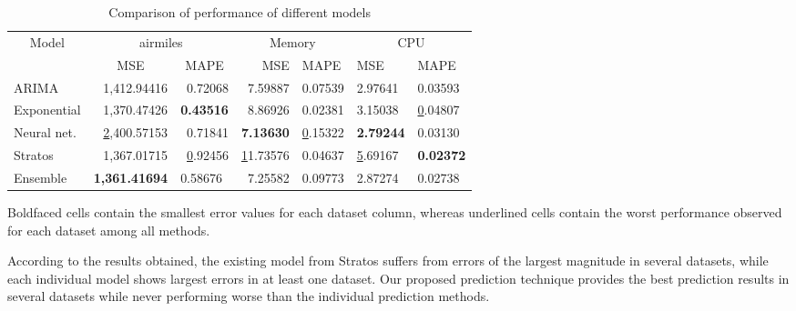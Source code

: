 \begin{table}[]
\centering
\caption{Comparison of performance of different models}
\label{my-label}
\begin{tabular}{|l|r|r|r|l|l|l|}
\hline
\multicolumn{1}{|c|}{\multirow{2}{*}{Model}} & \multicolumn{2}{c|}{airmiles}                                            & \multicolumn{2}{c|}{Memory}      & \multicolumn{2}{c|}{CPU}            \\ \cline{2-7} 
\multicolumn{1}{|c|}{}                       & \multicolumn{1}{c|}{MSE}                  & \multicolumn{1}{c|}{MAPE}    & MSE              & MAPE          & MSE              & MAPE             \\ \hline
ARIMA                                        & 1,412.94416                               & 0.72068                      & 7.59887          & 0.07539       & 2.97641          & 0.03593          \\ \hline
Exponential                                  & 1,370.47426                               & \textbf{0.43516}             & 8.86926          & 0.02381       & 3.15038          & {\ul 0.04807}    \\ \hline
Neural net.                                  & {\ul 2,400.57153}                         & 0.71841                      & \textbf{7.13630} & {\ul 0.15322} & \textbf{2.79244} & 0.03130          \\ \hline
Stratos                                      & 1,367.01715                               & {\ul 0.92456}                & {\ul 11.73576}   & 0.04637       & {\ul 5.69167}    & \textbf{0.02372} \\ \hline
Ensemble                                     & \multicolumn{1}{l|}{\textbf{1,361.41694}} & \multicolumn{1}{l|}{0.58676} & 7.25582          & 0.09773       & 2.87274          & 0.02738          \\ \hline
\end{tabular}
\end{table}

Boldfaced cells contain the smallest error values for each dataset column, whereas underlined cells contain the worst performance observed for each dataset among all methods. 

According to the results obtained, the existing model from Stratos suffers from errors of the largest magnitude in several datasets, while each individual model shows largest errors in at least one dataset. Our proposed prediction technique provides the best prediction results in several datasets while never performing worse than the individual prediction methods.